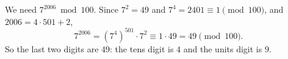 We need $7^{2006}\bmod 100$. Since $7^2=49$ and $7^4=2401\equiv1\pmod{100}$, and $2006=4\cdot501+2$,
\[
7^{2006}=(7^4)^{501}\cdot7^2\equiv1\cdot49=49\pmod{100}.
\]
So the last two digits are $49$: the tens digit is $\boxed{4}$ and the units digit is $\boxed{9}$.
